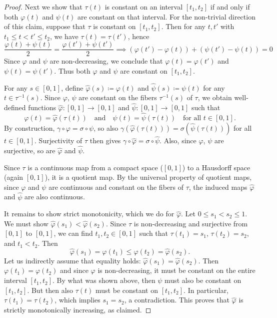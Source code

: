 \documentclass[a4paper,11pt]{article}
\numberwithin{equation}{section}
\theoremstyle{plain}
\theoremstyle{definition}
\newcommand{\g}{\gamma}
\newcommand{\s}{\sigma}
\newcommand{\vp}{\varphi}
\newcommand{\ps}{\psi}
\newcommand{\hvp}{\hat{\varphi}}
\newcommand{\hps}{\hat{\psi}}
\begin{document}
\begin{appendices}
\begin{proof}
Next we show that $\tau(t)$ is constant on an interval $[t_1, t_2]$ if and only if both $\vp(t)$ and $\ps(t)$ are constant on that interval. For the non-trivial direction of this claim, suppose that $\tau$ is constant on $[t_1, t_2]$. Then for any $t, t'$ with $t_1 \le t < t' \le t_2$, we have $\tau(t) = \tau(t')$, hence
\[
\frac{\vp(t) + \ps(t)}{2} = \frac{\vp(t') + \ps(t')}{2} \implies (\vp(t') - \vp(t)) + (\ps(t') - \ps(t)) = 0
\]
Since $\vp$ and $\ps$ are non-decreasing, we conclude that $\vp(t) = \vp(t')$ and $\ps(t) = \ps(t')$. Thus both $\vp$ and $\ps$ are constant on $[t_1, t_2]$.


For any $s \in [0,1]$, define $\hvp(s) \coloneqq \vp(t)$ and $\hps(s) \coloneqq \psi(t)$ for any $t \in \tau^{-1}(s)$. Since $\vp$, $\psi$ are constant on the fibers $\tau^{-1}(s)$ of $\tau$, we obtain well-defined functions 
$\hvp \colon [0,1] \to [0,1]$ and $\hps \colon [0,1] \to [0,1]$ such that
\[
\vp(t) = \hvp(\tau(t)) \quad \text{and} \quad \ps(t) = \hps(\tau(t)) \quad \text{for all } t \in [0,1].
\]
By construction, $\g\circ\vp = \sigma\circ \psi$, so also $\g(\hvp(\tau(t))) = \s(\hps(\tau(t)))$ for all $t\in [0,1]$.
Surjectivity of $\tau$ then gives $\g\circ \hvp = \sigma\circ \hps$. Also, since $\varphi$, $\psi$ are surjective, so are $\hvp$ and $\hps$.

Since $\tau$ is a continuous map from a compact space ($[0,1]$) to a Hausdorff space (again $[0,1]$), it is a quotient map. By the universal property of quotient maps, since $\vp$ and $\ps$ are continuous and constant on the fibers of $\tau$, the induced maps $\hvp$ and $\hps$ are also continuous.

It remains to show strict monotonicity, which we do for $\hat\varphi$. Let $0 \le s_1 < s_2 \le 1$. We must show $\hvp(s_1) < \hvp(s_2)$.
Since $\tau$ is non-decreasing and surjective from $[0,1]$ to $[0,1]$, we can find $t_1, t_2 \in [0,1]$ such that $\tau(t_1) = s_1$, $\tau(t_2) = s_2$, and $t_1 < t_2$. Then
\[
\hat\varphi(s_1) = \varphi(t_1) \le \varphi(t_2) = \hat\varphi(s_2).
\]
Let us indirectly assume that equality holds: $\hvp(s_1) = \hvp(s_2)$. Then $\vp(t_1) = \vp(t_2)$ and since $\vp$ is non-decreasing, it must be constant on the entire interval $[t_1, t_2]$. By what was shown above, then $\ps$ must also be constant on $[t_1, t_2]$.
But then also $\tau(t)$ must be constant on $[t_1, t_2]$. In particular, $\tau(t_1) = \tau(t_2)$, which implies $s_1 = s_2$, a contradiction.
This proves that $\hvp$ is strictly monotonically increasing, as claimed.
\end{proof}
\end{appendices}
\end{document}
